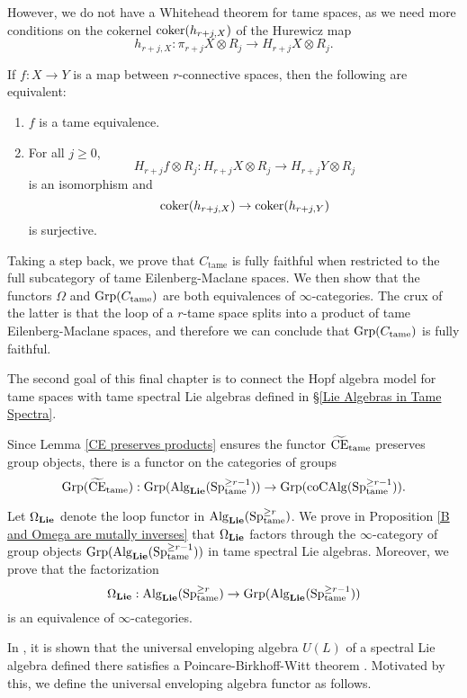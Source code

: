 	However, we do not have a Whitehead theorem for tame spaces, as we need more conditions on the cokernel $\operatorname{coker}(h_{r+j, X})$ of the Hurewicz map
	$$
	h_{r+j,X}: \pi_{r+j}X\otimes R_j \to 
	H_{r+j}X\otimes R_j.
	$$
	\begin{proposition}
	\cite[Proposition 1.1]{Felix-LemaireII}
	If $f:X \to Y$ is a map between $r$-connective spaces, then the following are equivalent:
\begin{enumerate}
    \item $f$ is a tame equivalence.
    \item For all $j\geq 0$, 
    $$
    H_{r+j}f \otimes R_j: 
    H_{r+j}X \otimes R_j
	\to 
	H_{r+j}Y \otimes R_j
    $$
    is an isomorphism and 
    $$
    \operatorname{coker}(h_{r+j,X}) \to \operatorname{coker}(h_{r+j,Y})
    $$
    is surjective.
\end{enumerate}
	\end{proposition}
	
	Taking a step back, we prove that $C_{\operatorname{tame}}$ is fully faithful when restricted to the full subcategory of tame Eilenberg-Maclane spaces.
We then show that the functors $\Omega$ and $\operatorname{Grp}(C_{\operatorname{tame}})$ are both equivalences of $\infty$-categories. 
The crux of the latter is that the loop of a $r$-tame space splits into a product of tame Eilenberg-Maclane spaces, and therefore we can conclude that $\operatorname{Grp}(C_{\operatorname{tame}})$ is fully faithful.

The second goal of this final chapter is to connect the Hopf algebra model for tame spaces with tame spectral Lie algebras defined in \S \ref{Lie Algebras in Tame Spectra}.

Since Lemma \ref{CE preserves products} ensures the functor $\widetilde{\operatorname{CE}}_{\operatorname{\operatorname{tame}}}$ preserves group objects, there is a functor on the categories of groups
\[
	\operatorname{Grp}(\widetilde{\operatorname{CE}}_{\operatorname{\operatorname{tame}}}):
	\operatorname{Grp}(\operatorname{Alg}_{\mathbf{Lie}}(\operatorname{Sp}^{\geq r-1}_{\operatorname{\operatorname{tame}}}))
	\to 
	\operatorname{Grp}(\operatorname{coCAlg}(\operatorname{Sp}^{\geq r-1}_{\operatorname{\operatorname{tame}}})).
\]

Let $\Omega_{\mathbf{Lie}}$ denote the loop functor in $\operatorname{Alg}_{\mathbf{Lie}}(\operatorname{Sp}^{\geq r}_{\operatorname{\operatorname{tame}}}) $. We prove in Proposition \ref{B and Omega are mutally inverses} that $\Omega_{\mathbf{Lie}}$ factors through the $\infty$-category of group objects $\operatorname{Grp}(\operatorname{Alg}_{\mathbf{Lie}}(\operatorname{Sp}^{\geq r-1}_{\operatorname{\operatorname{tame}}}))$ in tame spectral Lie algebras. Moreover, we prove that the factorization
$$
\Omega_{\mathbf{Lie}}: \operatorname{Alg}_{\mathbf{Lie}}(\operatorname{Sp}^{\geq r}_{\operatorname{\operatorname{tame}}})
\to 
\operatorname{Grp}(\operatorname{Alg}_{\mathbf{Lie}}(\operatorname{Sp}^{\geq r-1}_{\operatorname{\operatorname{tame}}}))
$$
is an equivalence of $\infty$-categories.

In \cite{KnudsenHEA}, it is shown that the universal enveloping algebra $U(L)$ of a spectral Lie algebra defined there satisfies a Poincare-Birkhoff-Witt theorem
\cite[Theorem B]{KnudsenHEA}.
Motivated by this, we define the universal enveloping algebra functor as follows.

